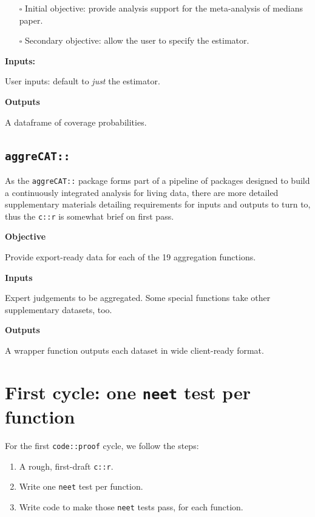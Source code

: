 \documentclass[
]{article}
\providecommand{\tightlist}{%
  \setlength{\itemsep}{0pt}\setlength{\parskip}{0pt}}
\begin{document}
\begin{itemize}
\item[$\square$]
  Initial objective: provide analysis support for the meta-analysis of
  medians paper.
\item[$\square$]
  Secondary objective: allow the user to specify the estimator.
\end{itemize}

\textbf{Inputs:}

User inputs: default to \emph{just} the estimator.

\textbf{Outputs}

A dataframe of coverage probabilities.

\hypertarget{aggrecat}{%
\subsection{\texorpdfstring{\texttt{aggreCAT::}}{aggreCAT::}}\label{aggrecat}}

As the \texttt{aggreCAT::} package forms part of a pipeline of packages
designed to build a continuously integrated analysis for living data,
there are more detailed supplementary materials detailing requirements
for inputs and outputs to turn to, thus the \texttt{c::r} is somewhat
brief on first pass.

\textbf{Objective}

Provide export-ready data for each of the 19 aggregation functions.

\textbf{Inputs}

Expert judgements to be aggregated. Some special functions take other
supplementary datasets, too.

\textbf{Outputs}

A wrapper function outputs each dataset in wide client-ready format.

\hypertarget{first-cycle-one-neet-test-per-function}{%
\section{\texorpdfstring{First cycle: one \texttt{neet} test per
function}{First cycle: one neet test per function}}\label{first-cycle-one-neet-test-per-function}}

For the first \texttt{code::proof} cycle, we follow the steps:

\begin{enumerate}
\def\labelenumi{\arabic{enumi}.}
\tightlist
\item
  A rough, first-draft \texttt{c::r}.
\item
  Write one \texttt{neet} test per function.
\item
  Write code to make those \texttt{neet} tests pass, for each function.
\end{enumerate}
\end{document}
